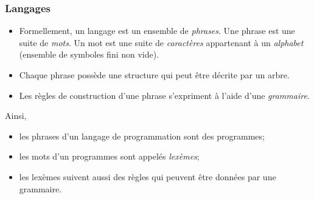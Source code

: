 %
\begin{frame}
\frametitle{Langages}

\begin{itemize}

  \item Formellement, un langage est un ensemble de
    \emph{phrases}. Une phrase est une suite de \emph{mots}. Un mot
    est une suite de \emph{caractères} appartenant à un
    \emph{alphabet} (ensemble de symboles fini non vide).

  \item Chaque phrase possède une structure qui peut être
    décrite par un arbre.

  \item Les règles de construction d'une phrase s'expriment
    à l'aide d'une \emph{grammaire}.

\end{itemize}
Ainsi,
\begin{itemize}

  \item les phrases d'un langage de programmation sont des
    programmes;

  \item les mots d'un programmes sont appelés
  \emph{lexèmes};

  \item les lexèmes suivent aussi des règles qui peuvent
    être données par une grammaire.

\end{itemize}

\end{frame}

